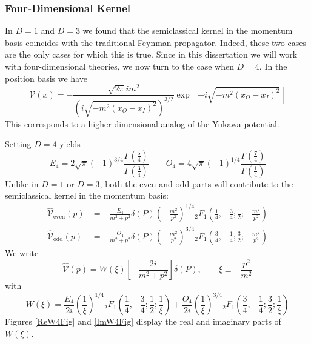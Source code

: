 \subsubsection{Four-Dimensional Kernel}
In $D = 1$ and $D = 3$ we found that the semiclassical kernel in the momentum basis coincides with the traditional Feynman propagator. Indeed, these two cases are the only cases for which this is true. Since in this dissertation we will work with four-dimensional theories, we now turn to the case when $D = 4$. In the position basis we have
\begin{equation}
	\mathcal{V}(x) = -\frac{{\sqrt{2 \pi} i } m^{2}}{\left( i \sqrt{-m^{2} (x_{O} - x_{I})^{2}} \right)^{3/2}} \exp{\left[ -i \sqrt{- m^{2} (x_{O} - x_{I})^{2}} \right]} \label{VleckPropaX4}
\end{equation}
This corresponds to a higher-dimensional analog of the Yukawa potential.

Setting $D = 4$ yields
\begin{equation}
	E_{4} = 2 \sqrt{\pi} (-1)^{3/4} \frac{\Gamma\left(\frac{5}{4}\right)}{\Gamma\left(\frac{3}{4}\right)} \qquad O_{4} = 4 \sqrt{\pi} (-1)^{1/4} \frac{\Gamma\left(\frac{7}{4}\right)}{\Gamma\left(\frac{1}{4}\right)}
\end{equation}
Unlike in $D = 1$ or $D = 3$, both the even and odd parts will contribute to the semiclassical kernel in the momentum basis:
\begin{align}
	\widehat{\mathcal{V}}_{\text{even}}(p) &= -\frac{E_{4}}{m^{2} + p^{2}} \delta(P) \left(- \frac{m^{2}}{p^{2}} \right)^{1/4} {}_{2} F_{1} \left( \frac{1}{4}, -\frac{3}{4}; \frac{1}{2}; - \frac{m^{2}}{p^{2}}  \right) \\
	\widehat{\mathcal{V}}_{\text{odd}}(p) &=	 -\frac{O_{4}}{m^{2} + p^{2}} \delta(P) \left(- \frac{m^{2}}{p^{2}} \right)^{3/4} {}_{2} F_{1} \left( \frac{3}{4}, -\frac{1}{4}; \frac{3}{2}; - \frac{m^{2}}{p^{2}}  \right)
\end{align}
We write
\begin{equation}
	\widehat{\mathcal{V}}(p) = W(\xi) \left[ -\frac{2i}{m^{2} + p^{2}} \right] \delta(P), \qquad \xi \equiv - \frac{p^{2}}{m^{2}} \label{VleckP4}
\end{equation}
with
\begin{equation}
	W(\xi) = \frac{E_{4}}{2i} \left( \frac{1}{\xi} \right)^{1/4} {}_{2} F_{1} \left( \frac{1}{4}, -\frac{3}{4}; \frac{1}{2}; \frac{1}{\xi}  \right) + \frac{O_{4}}{2i} \left( \frac{1}{\xi} \right)^{3/4} {}_{2} F_{1} \left( \frac{3}{4}, -\frac{1}{4}; \frac{3}{2}; \frac{1}{\xi}  \right) \nonumber
\end{equation}
Figures \ref{ReW4Fig} and \ref{ImW4Fig} display the real and imaginary parts of $W(\xi)$.

